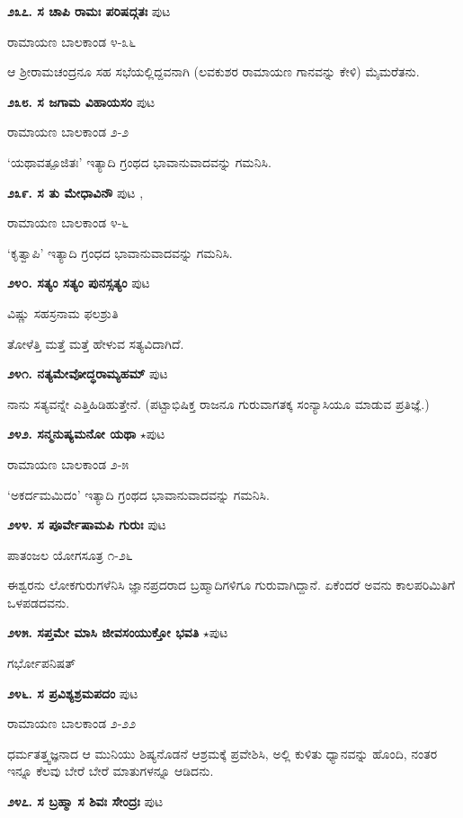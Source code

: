 \medskip
\noindent\textbf{೨೩೭. ಸ ಚಾಪಿ ರಾಮಃ ಪರಿಷದ್ಗತಃ} \hfill ಪುಟ \pageref{168}

\hfill ರಾಮಾಯಣ ಬಾಲಕಾಂಡ ೪-೩೬

ಆ ಶ್ರೀರಾಮಚಂದ್ರನೂ ಸಹ ಸಭೆಯಲ್ಲಿದ್ದವನಾಗಿ (ಲವಕುಶರ ರಾಮಾಯಣ ಗಾನವನ್ನು ಕೇಳಿ) ಮೈಮರೆತನು.

\medskip
\noindent\textbf{೨೩೮. ಸ ಜಗಾಮ ವಿಹಾಯಸಂ} \hfill ಪುಟ \pageref{163}

\hfill ರಾಮಾಯಣ ಬಾಲಕಾಂಡ ೨-೨

`ಯಥಾವತ್ಪೂಜಿತಃ' ಇತ್ಯಾದಿ ಗ್ರಂಥದ ಭಾವಾನುವಾದವನ್ನು ಗಮನಿಸಿ.

\medskip
\noindent\textbf{೨೩೯. ಸ ತು ಮೇಧಾವಿನೌ} \hfill ಪುಟ \pageref{239},\pageref{240}

\hfill ರಾಮಾಯಣ ಬಾಲಕಾಂಡ ೪-೬

`ಕೃತ್ವಾಪಿ' ಇತ್ಯಾದಿ ಗ್ರಂಧದ ಭಾವಾನುವಾದವನ್ನು ಗಮನಿಸಿ.

\medskip
\noindent\textbf{೨೪೦. ಸತ್ಯಂ ಸತ್ಯಂ ಪುನಸ್ಸತ್ಯಂ} \hfill ಪುಟ \pageref{130}

\hfill ವಿಷ್ಣು ಸಹಸ್ರನಾಮ ಫಲಶ್ರುತಿ

ತೋಳೆತ್ತಿ ಮತ್ತೆ ಮತ್ತೆ ಹೇಳುವ ಸತ್ಯವಿದಾಗಿದೆ.

\medskip
\noindent\textbf{೨೪೧. ನತ್ಯಮೇವೋದ್ಧರಾಮ್ಯಹಮ್} \hfill ಪುಟ \pageref{40}

ನಾನು ಸತ್ಯವನ್ನೇ ಎತ್ತಿಹಿಡಿಹುತ್ತೇನೆ. (ಪಟ್ಟಾಭಿಷಿಕ್ತ ರಾಜನೂ ಗುರುವಾಗತಕ್ಕ ಸಂನ್ಯಾಸಿಯೂ ಮಾಡುವ ಪ್ರತಿಜ್ಞೆ.)

\medskip
\noindent\textbf{೨೪೨. ಸನ್ಮನುಷ್ಯಮನೋ ಯಥಾ} $\star$\hfill ಪುಟ \pageref{197}

\hfill ರಾಮಾಯಣ ಬಾಲಕಾಂಡ ೨-೫

`ಅಕರ್ದಮಮಿದಂ' ಇತ್ಯಾದಿ ಗ್ರಂಥದ ಭಾವಾನುವಾದವನ್ನು ಗಮನಿಸಿ.

\medskip
\noindent\textbf{೨೪೪. ಸ ಪೂರ್ವೇಷಾಮಪಿ ಗುರುಃ} \hfill ಪುಟ \pageref{129}

\hfill ಪಾತಂಜಲ ಯೋಗಸೂತ್ರ ೧-೨೬

ಈಶ್ವರನು ಲೋಕಗುರುಗಳೆನಿಸಿ ಜ್ಞಾನಪ್ರದರಾದ ಬ್ರಹ್ಮಾದಿಗಳಿಗೂ ಗುರುವಾಗಿದ್ದಾನೆ. ಏಕೆಂದರೆ ಅವನು ಕಾಲಪರಿಮಿತಿಗೆ ಒಳಪಡದವನು.

\medskip
\noindent\textbf{೨೪೫. ಸಪ್ತಮೇ ಮಾಸಿ ಜೀವಸಂಯುಕ್ತೋ ಭವತಿ} $\star$\hfill ಪುಟ \pageref{85}

\hfill ಗರ್ಭೋಪನಿಷತ್

\medskip
\noindent\textbf{೨೪೬. ಸ ಪ್ರವಿಶ್ಯಶ್ರಮಪದಂ} \hfill ಪುಟ \pageref{201}

\hfill ರಾಮಾಯಣ ಬಾಲಕಾಂಡ ೨-೨೨

ಧರ್ಮತತ್ತ್ವಜ್ಞನಾದ ಆ ಮುನಿಯು ಶಿಷ್ಯನೊಡನೆ ಆಶ್ರಮಕ್ಕೆ ಪ್ರವೇಶಿಸಿ, ಅಲ್ಲಿ ಕುಳಿತು ಧ್ಯಾನವನ್ನು ಹೊಂದಿ, ನಂತರ ಇನ್ನೂ ಕೆಲವು ಬೇರೆ ಬೇರೆ ಮಾತುಗಳನ್ನೂ ಆಡಿದನು.

\medskip
\noindent\textbf{೨೪೭. ಸ ಬ್ರಹ್ಮಾ ಸ ಶಿವಃ ಸೇಂದ್ರಃ} \hfill ಪುಟ \pageref{249}

